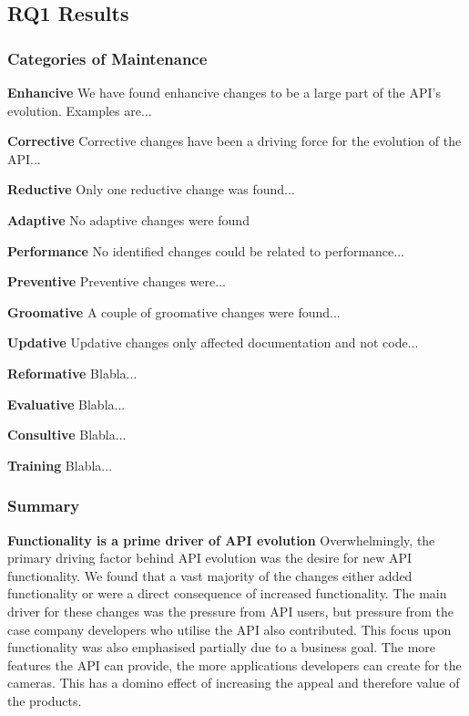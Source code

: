 \documentclass{sig-alternate}
\begin{document}
\subsection{RQ1 Results} \label{results_rq1}

\subsubsection{Categories of Maintenance}



\smallskip \noindent
\textbf{Enhancive  }
We have found enhancive changes to be a large part of the API's evolution. Examples are...


\smallskip \noindent
\textbf{Corrective  }
Corrective changes have been a driving force for the evolution of the API...

\smallskip \noindent
\textbf{Reductive  }
Only one reductive change was found...

\smallskip \noindent
\textbf{Adaptive  }
No adaptive changes were found

\smallskip \noindent
\textbf{Performance  }
No identified changes could be related to performance...

\smallskip \noindent
\textbf{Preventive  }
Preventive changes were...

\smallskip \noindent
\textbf{Groomative  }
A couple of groomative changes were found...

\smallskip \noindent
\textbf{Updative  }
Updative changes only affected documentation and not code...


\smallskip \noindent
\textbf{Reformative  }
Blabla...

\smallskip \noindent
\textbf{Evaluative  }
Blabla...

\smallskip \noindent
\textbf{Consultive  }
Blabla...

\smallskip \noindent
\textbf{Training  }
Blabla...

\subsubsection{Summary}


\noindent
\textbf{Functionality is a prime driver of API evolution  }  %
Overwhelmingly, the primary driving factor behind API evolution was the desire for new API functionality. We found that a vast majority of the changes either added functionality or were a direct consequence of increased functionality. The main driver for these changes was the pressure from API users, but pressure from the case company developers who utilise the API also contributed. This focus upon functionality was also emphasised partially due to a business goal. The more features the API can provide, the more applications developers can create for the cameras. This has a domino effect of increasing the appeal and therefore value of the products.
\end{document}
